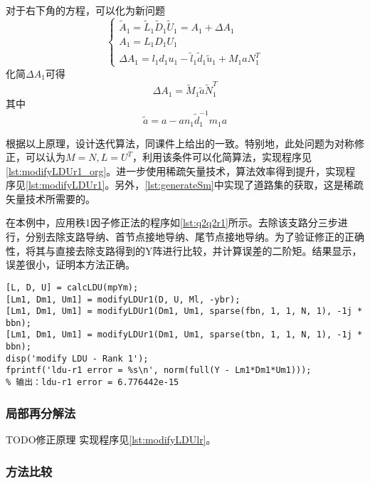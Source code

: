 \documentclass[a4paper,12pt]{article}
\begin{document}
    对于右下角的方程，可以化为新问题
    \begin{equation}
      \left\{
        \begin{array}{l}
          \widetilde A_1 = \widetilde L_1 \widetilde D_1 \widetilde U_1 = A_1 + \Delta A_1 \\
          A_1 = L_1 D_1 U_1\\
          \Delta A_1 = l_1d_1u_1-\widetilde l_1 \widetilde d_1 \widetilde u_1 + M_1aN_1^T
        \end{array}
      \right.
    \end{equation}
    化简$\Delta A_1$可得
    \begin{equation}
      \Delta A_1=\widetilde M_1 \widetilde a \widetilde N_1^T
    \end{equation}
    其中
    \begin{equation}
      \widetilde a=a-an_1\widetilde d_1^{-1}m_1a
    \end{equation}

    根据以上原理，设计迭代算法，同课件上给出的一致。特别地，此处问题为对称修正，可以认为$M=N, L=U^T$，利用该条件可以化简算法，实现程序见\cref{lst:modifyLDUr1_org}。进一步使用稀疏矢量技术，算法效率得到提升，实现程序见\cref{lst:modifyLDUr1}。另外，\cref{lst:generateSm}中实现了道路集的获取，这是稀疏矢量技术所需要的。

    在本例中，应用秩1因子修正法的程序如\cref{lst:q2q2r1}所示。去除该支路分三步进行，分别去除支路导纳、首节点接地导纳、尾节点接地导纳。为了验证修正的正确性，将其与直接去除支路得到的Y阵进行比较，并计算误差的二阶矩。结果显示，误差很小，证明本方法正确。
    \begin{lstlisting}[style=Matlab-editor,basicstyle=\mlttfamily,caption={秩1因子修正法去除支路},label=lst:q2q2r1]
[L, D, U] = calcLDU(mpYm);
[Lm1, Dm1, Um1] = modifyLDUr1(D, U, Ml, -ybr);
[Lm1, Dm1, Um1] = modifyLDUr1(Dm1, Um1, sparse(fbn, 1, 1, N, 1), -1j * bbn);
[Lm1, Dm1, Um1] = modifyLDUr1(Dm1, Um1, sparse(tbn, 1, 1, N, 1), -1j * bbn);
disp('modify LDU - Rank 1');
fprintf('ldu-r1 error = %s\n', norm(full(Y - Lm1*Dm1*Um1)));
% 输出：ldu-r1 error = 6.776442e-15
    \end{lstlisting}
    \subsubsection{局部再分解法}
    TODO修正原理
    实现程序见\cref{lst:modifyLDUlr}。
    \subsubsection{方法比较}
\end{document}
